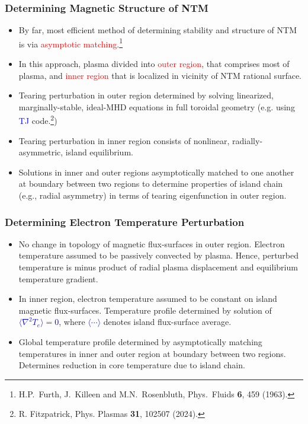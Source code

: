 \documentclass{beamer}
\begin{document}
\begin{frame}
\frametitle{Determining Magnetic Structure of NTM}
 
\begin{itemize}
\item By far,  most efficient method of determining stability and structure of NTM is via \textcolor{red}{asymptotic matching}.\footnote{H.P.~Furth,  J.~Killeen and M.N.~Rosenbluth,  Phys.\ Fluids {\bf 6}, 459 (1963).}
\item  In this approach, plasma divided into \textcolor{red}{outer region}, that comprises most of plasma, and \textcolor{red}{inner region} that is localized in vicinity of NTM rational surface. 
\item Tearing perturbation in outer region determined by solving linearized, marginally-stable,  ideal-MHD  equations in full toroidal geometry (e.g. using \textcolor{blue}{TJ} code.\footnote{R. Fitzpatrick, Phys. Plasmas {\bf 31}, 102507 (2024).})
\item Tearing perturbation in inner region consists of nonlinear, radially-asymmetric, island equilibrium.
\item Solutions in inner and outer regions asymptotically matched to one another at boundary between two regions to determine properties of island chain (e.g., radial asymmetry) in terms of
tearing eigenfunction in outer region. 
\end{itemize}

\end{frame}

\begin{frame}
\frametitle{Determining Electron Temperature Perturbation}
 
\begin{itemize}
\item No change in topology of magnetic flux-surfaces in outer region. Electron temperature assumed to be passively convected by plasma. Hence,
perturbed temperature is minus product of radial plasma displacement and equilibrium temperature gradient.
\item In inner region, electron temperature assumed to be constant on island magnetic flux-surfaces. Temperature profile determined by solution of \textcolor{blue}{$\langle \nabla^2 T_e\rangle=0$}, where
\textcolor{blue}{$\langle\cdots\rangle$} denotes island  flux-surface average.
\item Global temperature profile determined by asymptotically matching temperatures in inner and outer region at boundary between two regions. Determines reduction in core temperature due to island chain.
\end{itemize}

\end{frame}
\end{document}
